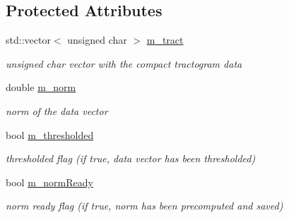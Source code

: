 \subsection*{\-Protected \-Attributes}
\begin{DoxyCompactItemize}
\item 
\hypertarget{classcompactTractChar_a9858a27555168640200c4a24c5ee6609}{std\-::vector$<$ unsigned char $>$ \hyperlink{classcompactTractChar_a9858a27555168640200c4a24c5ee6609}{m\-\_\-tract}}\label{classcompactTractChar_a9858a27555168640200c4a24c5ee6609}

\begin{DoxyCompactList}\small\item\em unsigned char vector with the compact tractogram data \end{DoxyCompactList}\item 
\hypertarget{classcompactTractChar_a69528625445282c25fc2ee39dca7463c}{double \hyperlink{classcompactTractChar_a69528625445282c25fc2ee39dca7463c}{m\-\_\-norm}}\label{classcompactTractChar_a69528625445282c25fc2ee39dca7463c}

\begin{DoxyCompactList}\small\item\em norm of the data vector \end{DoxyCompactList}\item 
\hypertarget{classcompactTractChar_a686d5b6ce4dac3c47f837930680e4313}{bool \hyperlink{classcompactTractChar_a686d5b6ce4dac3c47f837930680e4313}{m\-\_\-thresholded}}\label{classcompactTractChar_a686d5b6ce4dac3c47f837930680e4313}

\begin{DoxyCompactList}\small\item\em thresholded flag (if true, data vector has been thresholded) \end{DoxyCompactList}\item 
\hypertarget{classcompactTractChar_a61609bace0b492de949e14dd92b886d3}{bool \hyperlink{classcompactTractChar_a61609bace0b492de949e14dd92b886d3}{m\-\_\-norm\-Ready}}\label{classcompactTractChar_a61609bace0b492de949e14dd92b886d3}

\begin{DoxyCompactList}\small\item\em norm ready flag (if true, norm has been precomputed and saved) \end{DoxyCompactList}\end{DoxyCompactItemize}
